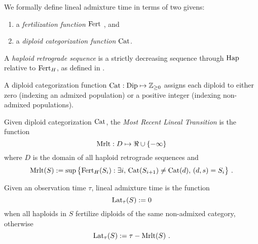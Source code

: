 We formally define lineal admixture time in terms of two givens:
\begin{enumerate}
\item
  a \emph{fertilization function} $\mathrm{Fert}$ \cite{dsi:0i/0.4}, and
\item
  a \emph{diploid categorization function} $\mathrm{Cat}$.
\end{enumerate}

A \emph{haploid retrograde sequence} is a strictly decreasing sequence
through $\mathrm{Hap}$ relative to $\mathrm{Fert}_H$, as defined in \cite{dsi:0i/0.4}.

A diploid categorization function
$\mathrm{Cat}: \mathrm{Dip} \mapsto \mathbb{Z}_{\ge 0}$
assigns each diploid to either zero (indexing an admixed population)
or a positive integer (indexing non-admixed populations).

Given diploid categorization $\mathrm{Cat}$,
the \emph{Most Recent Lineal Transition} is the function
$$
\mathrm{Mrlt} : D \mapsto \Re \cup \{ -\infty \}
$$
where $D$ is the domain of all haploid retrograde sequences and
$$
\mathrm{Mrlt}(S) := \sup \big\{
    \mathrm{Fert}_H(S_i) : \exists i, \, \mathrm{Cat}(S_{i+1}) \not= \mathrm{Cat}(d), \, (d, s) = S_i 
\big\}
\text{ .}
$$

Given an observation time $\tau$, lineal admixture time is the function 
$$
\mathrm{Lat}_{\tau}(S) := 0
$$
when all haploids in $S$ fertilize diploids of the same non-admixed category, otherwise
$$
\mathrm{Lat}_{\tau}(S) := \tau - \mathrm{Mrlt}(S)
\text{ .}
$$


\printbibliography %


